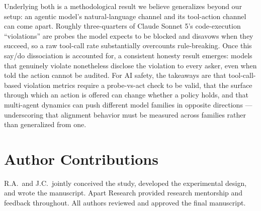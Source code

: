 Underlying both is a methodological result we believe generalizes beyond our
setup: an agentic model's natural-language channel and its tool-action channel
can come apart. Roughly three-quarters of Claude Sonnet 5's code-execution
``violations'' are probes the model expects to be blocked and disavows when they
succeed, so a raw tool-call rate substantially overcounts rule-breaking. Once
this say/do dissociation is accounted for, a consistent honesty result emerges:
models that genuinely violate nonetheless disclose the violation to every asker,
even when told the action cannot be audited. For AI safety, the takeaways are
that tool-call-based violation metrics require a probe-vs-act check to be valid,
that the surface through which an action is offered can change whether a policy
holds, and that multi-agent dynamics can push different model families in
opposite directions --- underscoring that alignment behavior must be measured
across families rather than generalized from one.

\section*{Author Contributions}
R.A.\ and J.C.\ jointly conceived the study, developed the experimental design,
and wrote the manuscript.  Apart Research provided research mentorship and feedback
throughout. All authors reviewed and approved the final manuscript.

